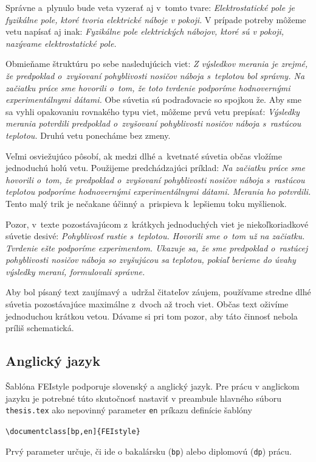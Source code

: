 Správne a~plynulo bude veta vyzerať aj v~tomto tvare:
\emph{Elektrostatické pole je fyzikálne pole,
ktoré tvoria elektrické náboje v pokoji.}
V prípade potreby môžeme vetu napísať aj inak:
\emph{Fyzikálne pole elektrických nábojov,
ktoré sú v pokoji, nazývame elektrostatické pole.}

Obmieňame štruktúru po sebe nasledujúcich viet:
\emph{Z výsledkov merania je zrejmé,
že predpoklad o~zvyšovaní pohyblivosti nosičov náboja
s~teplotou bol správny.
Na začiatku práce sme hovorili o~tom,
že toto tvrdenie podporíme hodnovernými experimentálnymi dátami.}
Obe súvetia sú podraďovacie so spojkou že.
Aby sme sa vyhli opakovaniu rovnakého typu viet,
môžeme prvú vetu prepísať:
\emph{Výsledky merania potvrdili predpoklad o~zvyšovaní
pohyblivosti nosičov náboja s~rastúcou teplotou.}
Druhú vetu ponecháme bez zmeny.

Veľmi osviežujúco pôsobí, ak medzi dlhé a~kvetnaté súvetia
občas vložíme jednoduchú holú vetu.
Použijeme predchádzajúci príklad:
\emph{Na začiatku práce sme hovorili o~tom,
že predpoklad o~zvyšovaní pohyblivosti nosičov náboja
s~rastúcou teplotou podporíme hodnovernými
experimentálnymi dátami.
Merania ho potvrdili.}
Tento malý trik je nečakane účinný a~prispieva k~lepšiemu
toku myšlienok.

Pozor, v~texte pozostávajúcom z~krátkych jednoduchých viet
je niekoľkoriadkové súvetie desivé:
\emph{Pohyblivosť rastie s~teplotou.
Hovorili sme o~tom už na začiatku.
Tvrdenie ešte podporíme experimentom.
Ukazuje sa, že sme predpoklad o~rastúcej pohyblivosti
nosičov náboja so zvyšujúcou sa teplotou,
pokiaľ berieme do úvahy výsledky meraní,
formulovali správne.}

Aby bol písaný text zaujímavý a~udržal čitateľov záujem,
používame stredne dlhé súvetia pozostávajúce maximálne
z~dvoch až troch viet.
Občas text oživíme jednoduchou krátkou vetou.
Dávame si pri tom pozor,
aby táto činnosť nebola príliš schematická.

\subsection{Anglický jazyk}
Šablóna FEIstyle podporuje slovenský a anglický jazyk.
Pre prácu v anglickom jazyku je potrebné túto skutočnosť nastaviť v preambule hlavného súboru \verb|thesis.tex| ako nepovinný parameter \verb|en| príkazu definície šablóny
\begin{trivlist}
\item \texttt{\textbackslash documentclass[bp,en]\{FEIstyle\}}
\end{trivlist}
Prvý parameter určuje, či ide o bakalársku (\verb|bp|) alebo diplomovú (\verb|dp|) prácu.

